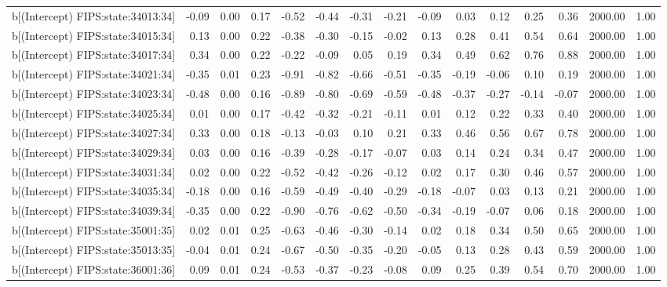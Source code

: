 \begin{table}[ht]
\begin{tabular}{rrrrrrrrrrrrrrr}
  b[(Intercept) FIPS:state:34013:34] & -0.09 & 0.00 & 0.17 & -0.52 & -0.44 & -0.31 & -0.21 & -0.09 & 0.03 & 0.12 & 0.25 & 0.36 & 2000.00 & 1.00 \\ 
  b[(Intercept) FIPS:state:34015:34] & 0.13 & 0.00 & 0.22 & -0.38 & -0.30 & -0.15 & -0.02 & 0.13 & 0.28 & 0.41 & 0.54 & 0.64 & 2000.00 & 1.00 \\ 
  b[(Intercept) FIPS:state:34017:34] & 0.34 & 0.00 & 0.22 & -0.22 & -0.09 & 0.05 & 0.19 & 0.34 & 0.49 & 0.62 & 0.76 & 0.88 & 2000.00 & 1.00 \\ 
  b[(Intercept) FIPS:state:34021:34] & -0.35 & 0.01 & 0.23 & -0.91 & -0.82 & -0.66 & -0.51 & -0.35 & -0.19 & -0.06 & 0.10 & 0.19 & 2000.00 & 1.00 \\ 
  b[(Intercept) FIPS:state:34023:34] & -0.48 & 0.00 & 0.16 & -0.89 & -0.80 & -0.69 & -0.59 & -0.48 & -0.37 & -0.27 & -0.14 & -0.07 & 2000.00 & 1.00 \\ 
  b[(Intercept) FIPS:state:34025:34] & 0.01 & 0.00 & 0.17 & -0.42 & -0.32 & -0.21 & -0.11 & 0.01 & 0.12 & 0.22 & 0.33 & 0.40 & 2000.00 & 1.00 \\ 
  b[(Intercept) FIPS:state:34027:34] & 0.33 & 0.00 & 0.18 & -0.13 & -0.03 & 0.10 & 0.21 & 0.33 & 0.46 & 0.56 & 0.67 & 0.78 & 2000.00 & 1.00 \\ 
  b[(Intercept) FIPS:state:34029:34] & 0.03 & 0.00 & 0.16 & -0.39 & -0.28 & -0.17 & -0.07 & 0.03 & 0.14 & 0.24 & 0.34 & 0.47 & 2000.00 & 1.00 \\ 
  b[(Intercept) FIPS:state:34031:34] & 0.02 & 0.00 & 0.22 & -0.52 & -0.42 & -0.26 & -0.12 & 0.02 & 0.17 & 0.30 & 0.46 & 0.57 & 2000.00 & 1.00 \\ 
  b[(Intercept) FIPS:state:34035:34] & -0.18 & 0.00 & 0.16 & -0.59 & -0.49 & -0.40 & -0.29 & -0.18 & -0.07 & 0.03 & 0.13 & 0.21 & 2000.00 & 1.00 \\ 
  b[(Intercept) FIPS:state:34039:34] & -0.35 & 0.00 & 0.22 & -0.90 & -0.76 & -0.62 & -0.50 & -0.34 & -0.19 & -0.07 & 0.06 & 0.18 & 2000.00 & 1.00 \\ 
  b[(Intercept) FIPS:state:35001:35] & 0.02 & 0.01 & 0.25 & -0.63 & -0.46 & -0.30 & -0.14 & 0.02 & 0.18 & 0.34 & 0.50 & 0.65 & 2000.00 & 1.00 \\ 
  b[(Intercept) FIPS:state:35013:35] & -0.04 & 0.01 & 0.24 & -0.67 & -0.50 & -0.35 & -0.20 & -0.05 & 0.13 & 0.28 & 0.43 & 0.59 & 2000.00 & 1.00 \\ 
  b[(Intercept) FIPS:state:36001:36] & 0.09 & 0.01 & 0.24 & -0.53 & -0.37 & -0.23 & -0.08 & 0.09 & 0.25 & 0.39 & 0.54 & 0.70 & 2000.00 & 1.00 \\ 

\end{tabular}
\end{table}
